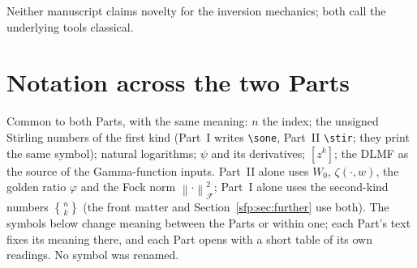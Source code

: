 \documentclass[11pt,letterpaper]{article}
\numberwithin{equation}{section}
\theoremstyle{definition}\newtheorem{definition}[theorem]{Definition}
\theoremstyle{remark}\newtheorem{remark}[theorem]{Remark}
\newcommand{\sone}[2]{\genfrac{[}{]}{0pt}{}{#1}{#2}}
\newcommand{\stwo}[2]{\genfrac{\{} {\}}{0pt}{}{#1}{#2}}
\newcommand{\stir}{\sone}
\newcommand{\Fock}[1]{\left\lVert #1\right\rVert_{\mathcal F}^{2}}
\begin{document}
\begin{itemize}
\end{itemize}
Neither manuscript claims novelty for the inversion mechanics; both call the underlying tools classical.

\section*{Notation across the two Parts}\label{sfp:sec:notation}
Common to both Parts, with the same meaning: $n$ the index; the unsigned Stirling numbers of the first kind (Part~I writes \verb!\sone!, Part~II \verb!\stir!; they print the same symbol); natural logarithms; $\psi$ and its derivatives; $[z^k]$; the DLMF as the source of the Gamma-function inputs. Part~II alone uses $W_0$, $\zeta(\cdot,w)$, the golden ratio $\varphi$ and the Fock norm $\Fock{\cdot}$; Part~I alone uses the second-kind numbers $\stwo nk$ (the front matter and Section~\ref{sfp:sec:further} use both). The symbols below change meaning between the Parts or within one; each Part's text fixes its meaning there, and each Part opens with a short table of its own readings. No symbol was renamed.
\begingroup\small
\renewcommand{\theHtable}{notation.\arabic{table}}
\end{document}
